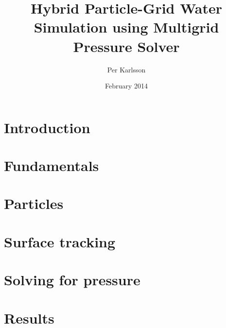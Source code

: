 \documentclass[a4paper,12pt]{article}
\begin{document}
\title{Hybrid Particle-Grid Water Simulation using Multigrid Pressure Solver}
\author{Per Karlsson}
\date{February 2014}
\maketitle



\tableofcontents
\setcounter{tocdepth}{2}

\newpage
\section{Introduction}



%

\newpage
\section{Fundamentals}




%


\newpage
\section{Particles}





\newpage
\section{Surface tracking}




\newpage
\section{Solving for pressure}







\newpage
\section{Results}


\newpage



\newpage



\end{document}
